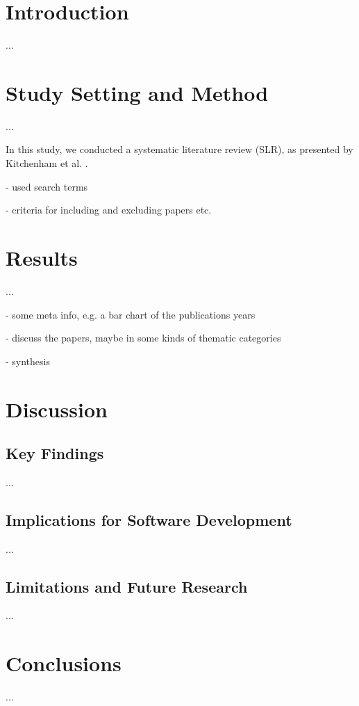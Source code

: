 \documentclass[sigconf]{acmart}
\begin{document}
	\section{Introduction}

	...

	\section{Study Setting and Method}

	...

	In this study, we conducted a systematic literature review (SLR), as presented by Kitchenham et al. \cite{kitchenham2004}.

	- used search terms

	- criteria for including and excluding papers etc.

	\section{Results}

	...

	- some meta info, e.g. a bar chart of the publications years

	- discuss the papers, maybe in some kinds of thematic categories

	- synthesis

	\section{Discussion}

	\subsection{Key Findings}

	...

	\subsection{Implications for Software Development}

	...

	\subsection{Limitations and Future Research}

	...

	\section{Conclusions}

	...




	
	
\end{document}
